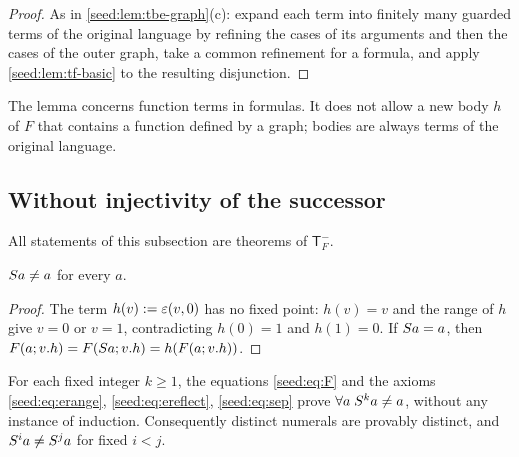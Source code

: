 \begin{proof}
As in \cref{seed:lem:tbe-graph}(c): expand each term into finitely many
guarded terms of the original language by refining the cases of its
arguments and then the cases of the outer graph, take a common refinement
for a formula, and apply \cref{seed:lem:tf-basic} to the resulting
disjunction.
\end{proof}

The lemma concerns function terms in formulas. It does not allow a new body
$h$ of $F$ that contains a function defined by a graph; bodies are always
terms of the original language.

\subsection{Without injectivity of the successor}

All statements of this subsection are theorems of $\mathsf{T}_F^{-}$.

\begin{lemma}\label{seed:lem:tf-nofix}
$S a\neq a$ for every $a$.
\end{lemma}

\begin{proof}
The term $h(v)\mathrel{:=}\varepsilon(v,0)$ has no fixed point: $h(v)=v$ and the
range of $h$ give $v=0$ or $v=1$, contradicting $h(0)=1$ and $h(1)=0$. If
$S a=a$, then $F(a;v.h)=F(S a;v.h)=h(F(a;v.h))$.
\end{proof}

\begin{theorem}\label{seed:thm:tf-acyclic}
For each fixed integer $k\geq1$, the equations \eqref{seed:eq:F} and the
axioms \eqref{seed:eq:erange}, \eqref{seed:eq:ereflect}, \eqref{seed:eq:sep}
prove $\forall a\;S^ka\neq a$, without any instance of induction.
Consequently distinct numerals are provably distinct, and
$S^ia\neq S^ja$ for fixed $i<j$.
\end{theorem}

